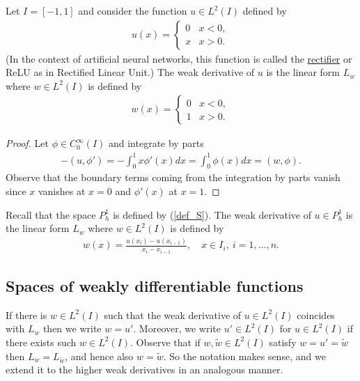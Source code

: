 \documentclass[12pt,oneside]{amsart}
\begin{document}
\begin{example}\label{ex_relu}
Let $I = [-1,1]$ and consider the function $u \in L^2(I)$ defined by
    \begin{align*}
u(x) = \begin{cases}
0 & x < 0,
\\
x & x > 0.
\end{cases}
    \end{align*}
(In the context of artificial neural networks, this function is called the \href{https://en.wikipedia.org/wiki/Rectifier_(neural_networks)}{rectifier} or ReLU as in Rectified Linear Unit.)
The weak derivative of $u$ is the linear form $L_w$ where
$w \in L^2(I)$ is defined by 
    \begin{align*}
w(x) = \begin{cases}
0 & x < 0,
\\
1 & x > 0.
\end{cases}
    \end{align*}
\end{example}
\begin{proof}
Let $\phi \in C_0^\infty(I)$ and integrate by parts
    \begin{align*}
-(u, \phi') = -\int_0^1 x \phi'(x) dx = \int_0^1 \phi(x) dx
= (w, \phi).
    \end{align*}
Observe that the boundary terms coming from the integration by parts vanish since $x$ vanishes at $x = 0$ and $\phi'(x)$ at $x = 1$. 
\end{proof}

\begin{example}\label{ex_deriv_P1h}
Recall that the space $P^1_h$ is defined by (\ref{def_S}).
The weak derivative of $u \in P^1_h$ is the linear form $L_w$ where
$w \in L^2(I)$ is defined by 
    \begin{align*}
w(x) = \frac{u(x_i) - u(x_{i-1})}{x_i - x_{i-1}}, \quad x \in I_i,\ i=1,\dots,n.
    \end{align*}
\end{example}

\subsection{Spaces of weakly differentiable functions}

If there is $w \in L^2(I)$ such that the weak derivative of $u \in L^2(I)$ coincides with $L_w$ then we write $w = u'$.
Moreover, we write $u' \in L^2(I)$ for $u \in L^2(I)$ if there exists such $w \in L^2(I)$.
Observe that if $w, \tilde w \in L^2(I)$ satisfy $w = u' = \tilde w$ then $L_w = L_{\tilde w}$, and hence also $w = \tilde w$. 
So the notation makes sense, and we extend it to the higher weak derivatives in an analogous manner. 
\end{document}
